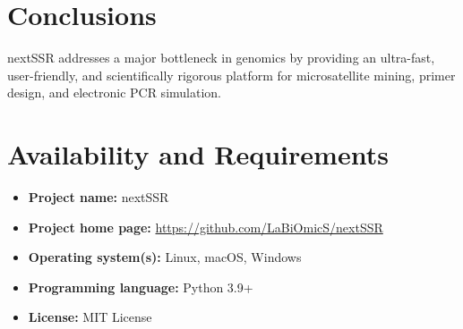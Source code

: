 \documentclass[fullpage]{article}
\begin{document}
\section*{Conclusions}
nextSSR addresses a major bottleneck in genomics by providing an ultra-fast, user-friendly, and scientifically rigorous platform for microsatellite mining, primer design, and electronic PCR simulation.

\section*{Availability and Requirements}
\begin{itemize}
    \item \textbf{Project name:} nextSSR
    \item \textbf{Project home page:} \url{https://github.com/LaBiOmicS/nextSSR}
    \item \textbf{Operating system(s):} Linux, macOS, Windows
    \item \textbf{Programming language:} Python 3.9+
    \item \textbf{License:} MIT License
\end{itemize}



\end{document}
